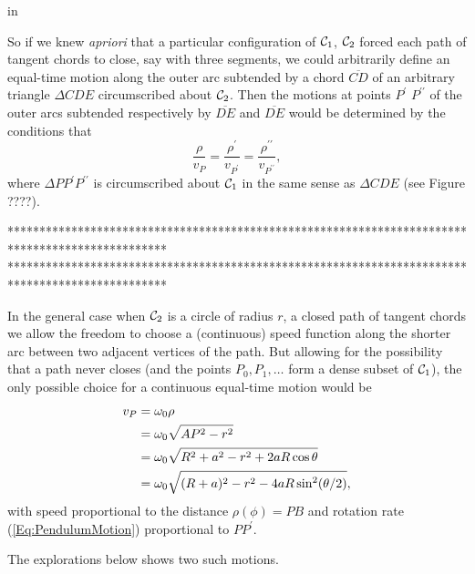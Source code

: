 \documentclass{ximera}
\newcommand{\pskip}{\vskip 0.1 in}
\begin{document}
\pskip




So if we knew \emph{apriori} that a particular configuration of ${\cal C}_1$, ${\cal C}_2$ forced each path of tangent chords to close, say with three segments, we could arbitrarily define an equal-time motion along the outer arc subtended by a chord $\overline{CD}$ of an arbitrary triangle $\Delta CDE$ circumscribed about ${\cal C}_2$. Then the motions at points $P^\prime$ $P^{\prime\prime}$ of the outer arcs subtended respectively by $\overline{DE}$ and $\overline{DE}$ would be determined by the conditions that
\[
       \frac{\rho}{v_P} = \frac{\rho^\prime}{v_{P^\prime}} = \frac{\rho^{\prime\prime}}{v_{P^{\prime\prime}}},
\]
where $\Delta PP^\prime P^{\prime\prime}$ is circumscribed about ${\cal C}_1$ in the same sense as $\Delta CDE$ (see Figure ????).

*************************************************************************************************
*************************************************************************************************
\fi

In the general case when ${\cal C}_2$ is a circle of radius $r$, a closed path of tangent chords we allow the freedom to choose a (continuous) speed function along the shorter arc between two adjacent vertices of the path. But allowing for the possibility that a path never closes (and the points $P_0, P_1, \ldots$ form a dense subset of ${\cal C}_1$), the only possible choice for a continuous equal-time motion would be
\begin{align}
    v_P  &= \omega_0 \rho   \notag  \\ 
          &= \omega_0 \sqrt{AP^2 - r^2}  \notag \\
          &= \omega_0 \sqrt{R^2 + a^2 - r^2 + 2aR \cos\theta} \notag \\
          &= \omega_0  \sqrt{(R+a)^2 - r^2 - 4aR\sin^2 (\theta/2)}, \label{Eq:EqualTime8}
\end{align}
with speed proportional to the distance $\rho(\phi) = PB$ and rotation rate (\ref{Eq:PendulumMotion}) proportional to $PP^\prime$.

\begin{onlineOnly}
    \begin{center}
\end{center}
\end{onlineOnly}



The explorations below shows two such motions.
\end{document}
